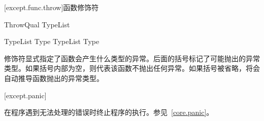 [except.func.throw]{函数修饰符}

\begin{bnf}{ThrowQual}
     \terminal{(} TypeList\bnfs \terminal{)} \br
\end{bnf}

\begin{bnf}{TypeList}
    Type \br
    TypeList \terminal{,} Type
\end{bnf}

\pnum
{}修饰符显式指定了函数会产生什么类型的异常。后面的括号标记了可能抛出的异常类型。如果括号内部为空，则代表该函数不抛出任何异常。如果括号被省略，将会自动推导函数抛出的异常类型。

[except.panic]{}

\pnum
{}在程序遇到无法处理的错误时终止程序的执行。参见~\ref{core.panic}。